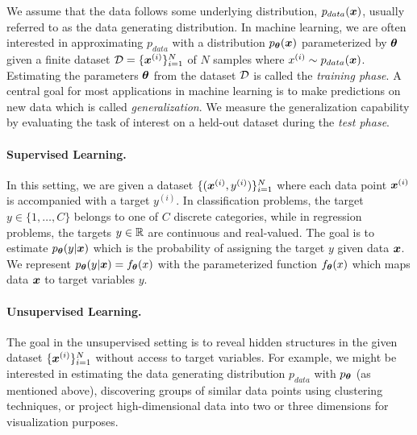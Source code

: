 We assume that the data follows some underlying distribution, $p_{data}({\bm{x}})$, usually referred to as the data generating distribution. In machine learning, we are often interested in approximating $p_{data}$ with a distribution $p_{{\bm{\theta}}}({\bm{x}})$ parameterized by ${\bm{\theta}}$ given a finite dataset ${\mathcal{D}} = \{{\bm{x}}^{(i)}\}_{i=1}^{N}$ of $N$ samples where $x^{(i)} \sim p_{data}({\bm{x}})$. Estimating the parameters ${\bm{\theta}}$ from the dataset ${\mathcal{D}}$ is called the \textit{training phase}. A central goal for most applications in machine learning is to make predictions on new data which is called \textit{generalization}. We measure the generalization capability by evaluating the task of interest on a held-out dataset during the \textit{test phase}.

\vspace{-3mm}
\paragraph{Supervised Learning.} In this setting, we are given a dataset $\{({\bm{x}}^{(i)}, y^{(i)})\}_{i=1}^{N}$ where each data point ${\bm{x}}^{(i)}$ is accompanied with a target $y^{(i)}$. In classification problems, the target $y \in \{1, \dots, C\}$ belongs to one of $C$ discrete categories, while in regression problems, the targets $y \in \mathbb{R}$ are continuous and real-valued. The goal is to estimate $p_{{\bm{\theta}}}(y | {\bm{x}})$ which is the probability of assigning the target $y$ given data ${\bm{x}}$. We represent $p_{{\bm{\theta}}}(y | {\bm{x}}) = f_{{\bm{\theta}}}(x)$ with the parameterized function $f_{{\bm{\theta}}}(x)$ which maps data ${\bm{x}}$ to target variables $y$.  


\vspace{-3mm}
\paragraph{Unsupervised Learning.} The goal in the unsupervised setting is to reveal hidden structures in the given dataset $\{{\bm{x}}^{(i)}\}_{i=1}^{N}$ without access to target variables. For example, we might be interested in estimating the data generating distribution $p_{data}$ with $p_{{\bm{\theta}}}$ (as mentioned above), discovering groups of similar data points using clustering techniques, or project high-dimensional data into two or three dimensions for visualization purposes. 

